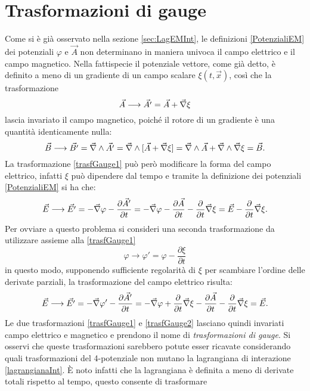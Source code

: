 \section{Trasformazioni di gauge}
Come si è già osservato nella sezione \ref{sec:LagEMInt}, le definizioni \eqref{PotenzialiEM} dei potenziali $\varphi$ e $\vec A$ non determinano in maniera univoca il campo elettrico e il campo magnetico. Nella fattispecie il potenziale vettore, come già detto, è definito a meno di un gradiente di un campo scalare $\xi(t,\vec x)$, così che la trasformazione
\begin{equation}
     \vec{A}\longrightarrow\vec {A'}=\vec A + \vec{\nabla} \xi \label{trasfGauge1}
\end{equation}
lascia invariato il campo magnetico, poiché il rotore di un gradiente è una quantità identicamente nulla: 
\begin{equation*}
    \vec B\longrightarrow\vec{B'}=\vec{\nabla}\wedge\vec {A'}=\vec{\nabla}\wedge[\vec A + \vec{\nabla} \xi]=\vec{\nabla}\wedge\vec A + \vec{\nabla}\wedge\vec{\nabla} \xi=\vec B.
\end{equation*}
La trasformazione \eqref{trasfGauge1} può però modificare la forma del campo elettrico, infatti $\xi$ può dipendere dal tempo e tramite la definizione dei potenziali \eqref{PotenzialiEM} si ha che:
\begin{equation*}
    \vec E\longrightarrow\vec{E'}=-\vec{\nabla} \varphi-\frac{\partial\vec A'}{\partial t}=-\vec{\nabla} \varphi-\frac{\partial\vec A}{\partial t}-\frac{\partial}{\partial t}\vec{\nabla}\xi=\vec{E}-\frac{\partial}{\partial t}\vec{\nabla}\xi.
\end{equation*}
Per ovviare a questo problema si consideri una seconda trasformazione da utilizzare assieme alla \eqref{trasfGauge1}
\begin{equation}
    \varphi \longrightarrow \varphi'=\varphi-\frac{\partial\xi}{\partial t}
    \label{trasfGauge2}
\end{equation}
in questo modo, supponendo sufficiente regolarità di $\xi$ per scambiare l'ordine delle derivate parziali, la trasformazione del campo elettrico risulta:
\begin{equation*}
    \vec E\longrightarrow\vec{E'}=-\vec{\nabla} \varphi'-\frac{\partial\vec A'}{\partial t}=-\vec{\nabla} \varphi+\frac{\partial}{\partial t}\vec{\nabla}\xi-\frac{\partial\vec A}{\partial t}-\frac{\partial}{\partial t}\vec{\nabla}\xi=\vec{E}.
\end{equation*}
Le due trasformazioni \eqref{trasfGauge1} e \eqref{trasfGauge2} lasciano quindi invariati campo elettrico e magnetico e prendono il nome di \emph{trasformazioni di gauge}. Si osservi che queste trasformazioni sarebbero potute esser ricavate considerando quali trasformazioni del 4-potenziale non mutano la lagrangiana di interazione \eqref{lagrangianaInt}. È noto infatti che la lagrangiana è definita a meno di derivate totali rispetto al tempo, questo consente di trasformare 
